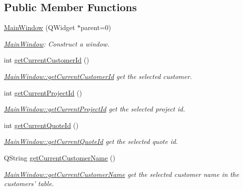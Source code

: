 \subsection*{Public Member Functions}
\begin{DoxyCompactItemize}
\item 
\hyperlink{classGui_1_1MainWindow_a5ea8e526d288b96595618942d44154d3}{Main\-Window} (Q\-Widget $\ast$parent=0)
\begin{DoxyCompactList}\small\item\em \hyperlink{classGui_1_1MainWindow}{Main\-Window}\-: Construct a window. \end{DoxyCompactList}\item 
int \hyperlink{classGui_1_1MainWindow_a202cb1e7a7c0e47af15306c2587693ec}{get\-Current\-Customer\-Id} ()
\begin{DoxyCompactList}\small\item\em \hyperlink{classGui_1_1MainWindow_a202cb1e7a7c0e47af15306c2587693ec}{Main\-Window\-::get\-Current\-Customer\-Id} get the selected customer. \end{DoxyCompactList}\item 
int \hyperlink{classGui_1_1MainWindow_a9580e96fd90710c5e2c299c68108409a}{get\-Current\-Project\-Id} ()
\begin{DoxyCompactList}\small\item\em \hyperlink{classGui_1_1MainWindow_a9580e96fd90710c5e2c299c68108409a}{Main\-Window\-::get\-Current\-Project\-Id} get the selected project id. \end{DoxyCompactList}\item 
int \hyperlink{classGui_1_1MainWindow_aaf5e1b2cb797894207f4c5e86d2d4dcf}{get\-Current\-Quote\-Id} ()
\begin{DoxyCompactList}\small\item\em \hyperlink{classGui_1_1MainWindow_aaf5e1b2cb797894207f4c5e86d2d4dcf}{Main\-Window\-::get\-Current\-Quote\-Id} get the selected quote id. \end{DoxyCompactList}\item 
Q\-String \hyperlink{classGui_1_1MainWindow_a0303a1752424b1e8c1a6e1b0bba2a823}{get\-Current\-Customer\-Name} ()
\begin{DoxyCompactList}\small\item\em \hyperlink{classGui_1_1MainWindow_a0303a1752424b1e8c1a6e1b0bba2a823}{Main\-Window\-::get\-Current\-Customer\-Name} get the selected customer name in the customers' table. \end{DoxyCompactList}\item 

\end{DoxyCompactItemize}
